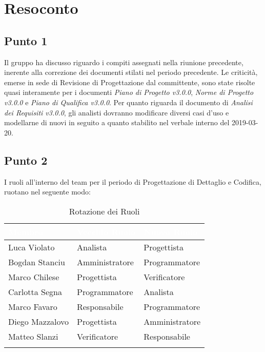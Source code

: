 \section{Resoconto}

\subsection{Punto 1}
Il gruppo ha discusso riguardo i compiti assegnati nella riunione precedente, inerente alla correzione dei documenti stilati nel periodo precedente. Le criticità, emerse in sede di Revisione di Progettazione dal committente, sono state risolte quasi interamente per i documenti \textit{Piano di Progetto v3.0.0}, \textit{Norme di Progetto v3.0.0} e \textit{Piano di Qualifica v3.0.0}. Per quanto riguarda il documento di \textit{Analisi dei Requisiti v3.0.0}, gli analisti dovranno modificare diversi casi d'uso e modellarne di nuovi in seguito a quanto stabilito nel verbale interno del 2019-03-20.
\\

\subsection{Punto 2}
I ruoli all'interno del team per il periodo di Progettazione di Dettaglio e Codifica, ruotano nel seguente modo:\\

\begin{center}
	\begin{longtable}[c]{|m{}|m{}|m{}|} 
		\hline
		\rowcolor{bluelogo}\textbf{\textcolor{white}{Membro}} & \textbf{\textcolor{white}{Vecchio Ruolo}} & \textbf{\textcolor{white}{Nuovo Ruolo}}\\
		\hline
		\hline
		Luca Violato & Analista & Progettista \\
		\hline
		\rowcolor{grigio}Bogdan Stanciu & Amministratore & Programmatore \\
		\hline
		Marco Chilese & Progettista & Verificatore\\
		\hline
		\rowcolor{grigio}Carlotta Segna & Programmatore & Analista\\
		\hline
		Marco Favaro & Responsabile & Programmatore \\
		\hline
		\rowcolor{grigio} Diego Mazzalovo & Progettista & Amministratore\\
		\hline
		Matteo Slanzi & Verificatore & Responsabile\\
		\hline
		\caption{Rotazione dei Ruoli}
	\end{longtable}

\end{center}
	
